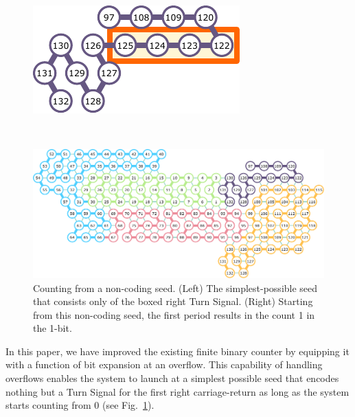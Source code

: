 \documentclass[twocolumn]{svjour3}
\begin{document}
\begin{figure}[tb]
\begin{minipage}{0.4\linewidth}
\centering
\includegraphics[width=\linewidth]{fig/svg/zeroBit01.pdf}
\end{minipage}
\begin{minipage}{0.05\linewidth}
\ \\
\end{minipage}
\begin{minipage}{0.45\linewidth}
\centering
\includegraphics[width=\linewidth]{fig/svg/zeroBit05.pdf}
\end{minipage}
\caption{Counting from a non-coding seed.
(Left) The simplest-possible seed that consists only of the boxed right Turn Signal. 
(Right) Starting from this non-coding seed, the first period results in the count 1 in the 1-bit. 
}
\label{fig:noncoding_seed}
\end{figure}

In this paper, we have improved the existing finite binary counter by equipping it with a function of bit expansion at an overflow.
This capability of handling overflows enables the system to launch at a simplest possible seed that encodes nothing but a Turn Signal for the first right carriage-return as long as the system starts counting from 0 (see Fig.~\ref{fig:noncoding_seed}). 
\end{document}
